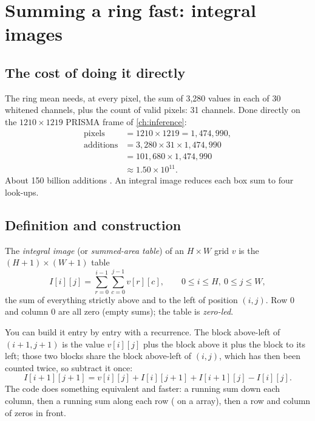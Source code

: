 \section{Summing a ring fast: integral images}\label{sec:residualmaha:integral}

\subsection{The cost of doing it directly}

The ring mean needs, at every pixel, the sum of 3,280 values in each of 30 whitened channels, plus the count of
valid pixels: 31 channels. Done directly on the $1210\times1219$ PRISMA frame of \cref{ch:inference}:
\begin{align*}
\text{pixels} &= 1210\times1219 = 1{,}474{,}990,\\
\text{additions} &= 3{,}280\times31\times1{,}474{,}990\\
&= 101{,}680\times1{,}474{,}990\\
&\approx 1.50\times10^{11}.
\end{align*}
About 150 billion additions \tagC. An integral image reduces each box sum to four look-ups.

\subsection{Definition and construction}

\begin{definition}
The \emph{integral image} (or \emph{summed-area table}) of an
$H\times W$ grid $v$ is the $(H+1)\times(W+1)$ table
\begin{equation}
I[i][j]=\sum_{r=0}^{i-1}\sum_{c=0}^{j-1}v[r][c],\qquad 0\le i\le H,\ 0\le j\le W,
\end{equation}
the sum of everything strictly above and to the left of position $(i,j)$. Row $0$ and column $0$ are all zero
(empty sums); the table is \emph{zero-led}.
\end{definition}

You can build it entry by entry with a recurrence. The block above-left of $(i+1,j+1)$ is the value $v[i][j]$
plus the block above it plus the block to its left; those two blocks share the block above-left of $(i,j)$,
which has then been counted twice, so subtract it once:
\begin{equation}
I[i+1][j+1]=v[i][j]+I[i][j+1]+I[i+1][j]-I[i][j].
\label{eq:residualmaha:recur}
\end{equation}
The code does something equivalent and faster: a running sum down each column, then a running sum along each
row ( on a  array), then a row and column of zeros in front.

